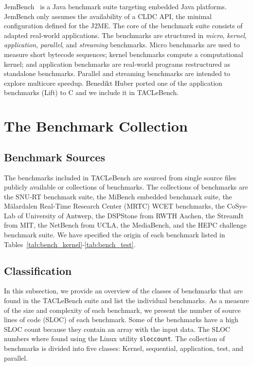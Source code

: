 \documentclass[a4paper,UKenglish]{oasics}
\newcommand{\todo}[1]{{\emph{TODO: #1}}}
\newcommand{\martin}[1]{{\color{blue} Martin: #1}}
\newcommand{\code}[1]{{\small{\texttt{#1}}}}
\begin{document}
JemBench~\cite{jembench} is a Java benchmark suite targeting
embedded Java platforms. JemBench only assumes the
availability of a CLDC API, the minimal configuration
defined for the J2ME. The core of the benchmark suite consists of
adapted real-world applications.
The benchmarks are structured in {\em micro}, {\em kernel}, {\em
application}, {\em parallel}, and {\em streaming} benchmarks.
Micro benchmarks are used to measure short bytecode sequences;
kernel benchmarks compute a computational kernel; and application
benchmarks are real-world programs restructured as standalone benchmarks.
Parallel and streaming benchmarks are intended to explore multicore
speedup.
Benedikt Huber ported one of the application benchmarks (Lift) to C
and we include it in TACLeBench.




\section{The Benchmark Collection}
\label{sec:collect}


\subsection{Benchmark Sources}
The benchmarks included in TACLeBench are sourced from single source files publicly available or collections of benchmarks.
The collections of benchmarks are the SNU-RT benchmark suite, the MiBench embedded benchmark suite, the M{\"a}lardalen Real-Time Research Center (MRTC) WCET benchmarks, the CoSys-Lab of University of Antwerp, the DSPStone from RWTH Aachen, the StreamIt from MIT, the NetBench from UCLA, the MediaBench, and the HEPC challenge benchmark suite.
We have specified the origin of each benchmark listed in Tables~\ref{tab:bench_kernel}-\ref{tab:bench_test}.


\subsection{Classification}
In this subsection, we provide an overview of the classes of benchmarks that are found in the TACLeBench suite and list the individual benchmarks.
As a measure of the size and complexity of each benchmark, we present the number of source lines of code (SLOC) of each benchmark.
Some of the benchmarks have a high SLOC count because they contain an array with the input data.
The SLOC numbers where found using the Linux utility \code{sloccount}.
The collection of benchmarks is divided into five classes: Kernel, sequential, application, test, and parallel.
\end{document}

